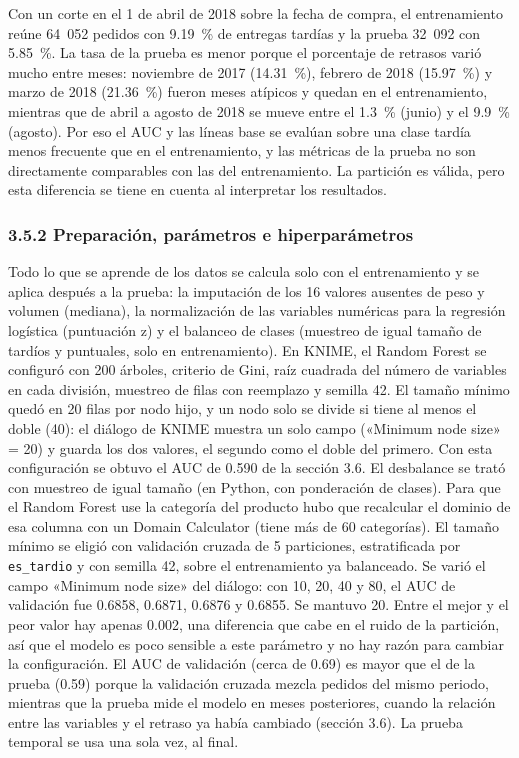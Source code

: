 \documentclass[a4paper,stu,12pt,donotrepeattitle,floatsintext]{apa7}
\begin{document}
Con un corte en el 1 de abril de 2018 sobre la fecha de compra, el entrenamiento reúne 64~052 pedidos con 9.19~\% de entregas tardías y la prueba 32~092 con 5.85~\%. La tasa de la prueba es menor porque el porcentaje de retrasos varió mucho entre meses: noviembre de 2017 (14.31~\%), febrero de 2018 (15.97~\%) y marzo de 2018 (21.36~\%) fueron meses atípicos y quedan en el entrenamiento, mientras que de abril a agosto de 2018 se mueve entre el 1.3~\% (junio) y el 9.9~\% (agosto). Por eso el AUC y las líneas base se evalúan sobre una clase tardía menos frecuente que en el entrenamiento, y las métricas de la prueba no son directamente comparables con las del entrenamiento. La partición es válida, pero esta diferencia se tiene en cuenta al interpretar los resultados.

\subsubsection{3.5.2 Preparación, parámetros e hiperparámetros}
Todo lo que se aprende de los datos se calcula solo con el entrenamiento y se aplica después a la prueba: la imputación de los 16 valores ausentes de peso y volumen (mediana), la normalización de las variables numéricas para la regresión logística (puntuación z) y el balanceo de clases (muestreo de igual tamaño de tardíos y puntuales, solo en entrenamiento). En KNIME, el Random Forest se configuró con 200 árboles, criterio de Gini, raíz cuadrada del número de variables en cada división, muestreo de filas con reemplazo y semilla 42. El tamaño mínimo quedó en 20 filas por nodo hijo, y un nodo solo se divide si tiene al menos el doble (40): el diálogo de KNIME muestra un solo campo («Minimum node size» = 20) y guarda los dos valores, el segundo como el doble del primero. Con esta configuración se obtuvo el AUC de 0.590 de la sección 3.6. El desbalance se trató con muestreo de igual tamaño (en Python, con ponderación de clases). Para que el Random Forest use la categoría del producto hubo que recalcular el dominio de esa columna con un Domain Calculator (tiene más de 60 categorías). El tamaño mínimo se eligió con validación cruzada de 5 particiones, estratificada por \texttt{es\_\allowbreak{}tardio} y con semilla 42, sobre el entrenamiento ya balanceado. Se varió el campo «Minimum node size» del diálogo: con 10, 20, 40 y 80, el AUC de validación fue 0.6858, 0.6871, 0.6876 y 0.6855. Se mantuvo 20. Entre el mejor y el peor valor hay apenas 0.002, una diferencia que cabe en el ruido de la partición, así que el modelo es poco sensible a este parámetro y no hay razón para cambiar la configuración. El AUC de validación (cerca de 0.69) es mayor que el de la prueba (0.59) porque la validación cruzada mezcla pedidos del mismo periodo, mientras que la prueba mide el modelo en meses posteriores, cuando la relación entre las variables y el retraso ya había cambiado (sección 3.6). La prueba temporal se usa una sola vez, al final.
\end{document}
